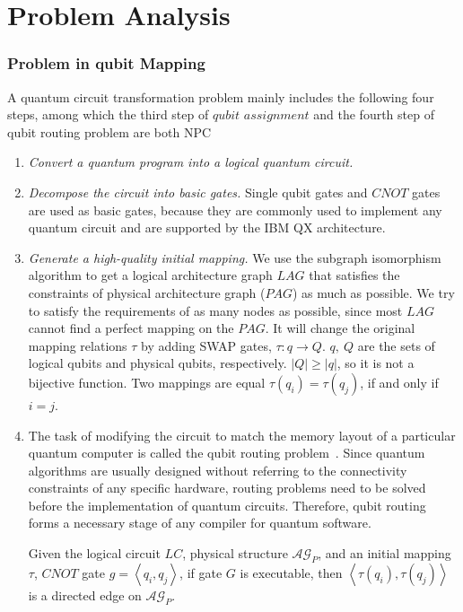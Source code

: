 \documentclass[runningheads]{llncs}
\begin{document}
\section{Problem Analysis}
\label{Problem Analysis}

\subsubsection{Problem in qubit Mapping}
A quantum circuit transformation problem mainly includes the following four steps, 
among which the third step of $qubit$ $assignment$ and the fourth step of qubit routing 
problem are both NPC~\cite{2018QubitSiraichi}
\begin{enumerate}
	\item \emph{Convert a quantum program into a logical quantum circuit.}
	\item \emph{Decompose the circuit into basic gates.} 
	Single qubit gates and $CNOT$ gates are used as basic gates, 
	because they are commonly used to implement any quantum circuit 
	and are supported by the IBM QX architecture.
	\item \emph{Generate a high-quality initial mapping.} 
	We use the subgraph isomorphism 
	algorithm to get a logical architecture graph $LAG$ that satisfies 
	the constraints of physical architecture graph ($PAG$) as much as possible. 
	We try to satisfy the requirements of as many nodes as possible, since most 
	$LAG$ cannot find a perfect mapping 
	on the $PAG$.
	It will change the original mapping relations $\tau$ by adding SWAP gates, $\tau:q \rightarrow Q $. 
	$q,\ Q$ are the sets of logical qubits and physical qubits, respectively.
	$|Q| \geq |q|$, so it is not a bijective function.
	Two mappings are equal $\tau(q_{i})=\tau(q_{j})$, if and only if $i=j$.
	\item The task of modifying the circuit to match the memory layout of 
	a particular quantum computer is called the qubit routing problem~\cite{Cowtan2019}. 
	Since quantum algorithms are usually designed without referring to 
	the connectivity constraints of any specific hardware, routing problems 
	need to be solved before the implementation of quantum circuits. 
	Therefore, qubit routing forms a necessary stage of any compiler 
	for quantum software.

	Given the logical circuit $LC$, physical structure $\mathcal{AG}_{P}$, 
	and an initial mapping $\tau$, $CNOT$ gate $g=\left \langle q_{i},q_{j}\right \rangle $, 
	if gate $G$ is executable, then $\left \langle\tau(q_{i}),\tau(q_{j})\right \rangle $ 
	is a directed edge on $\mathcal{AG}_{P}$.
\end{enumerate}
\end{document}
